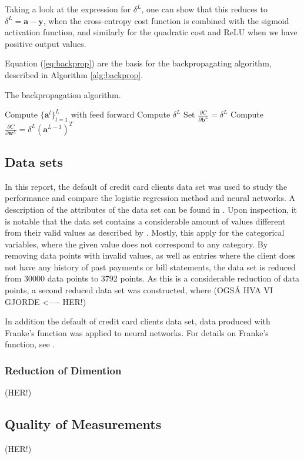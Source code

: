 Taking a look at the expression for $\delta^L$, one can show that this reduces to $\delta^L = \boldsymbol{a}-\boldsymbol{y}$, when the cross-entropy cost function is combined with the sigmoid activation function, and similarly for the quadratic cost and ReLU when we have positive output values.

Equation (\ref{eq:backprop}) are the basis for the backpropagating algorithm, described in Algorithm \ref{alg:backprop}.
\begin{algorithm}[htbp]\caption{The backpropagation algorithm.}\label{alg:backprop}
	\SetAlgoLined
	\BlankLine
	\BlankLine
	Compute $\{ \boldsymbol{a}^l\}_{l=1}^L$ with feed forward\;
	Compute $\delta^L$\;
	Set $\frac{\partial C}{\partial \boldsymbol{b}^L} = \delta^L$\;
	Compute $\frac{\partial C}{\partial \boldsymbol{w}^L} = \delta^L(\boldsymbol{a}^{L-1})^T$\;
	\BlankLine
	\BlankLine
	\end{algorithm}


\subsection{Data sets}
In this report, the default of credit card clients data set \citep{yeh2009UCI} was used to study the performance and compare the logistic regression method and neural networks. A description of the attributes of the data set can be found in \cite{yeh2009UCI}. Upon inspection, it is notable that the data set contains a considerable amount of values different from their valid values as described by \citeauthor{yeh2009UCI}. Mostly, this apply for the categorical variables, where the given value does not correspond to any category. By removing data points with invalid values, as well as entries where the client does not have any history of past payments or bill statements, the data set is reduced from 30000 data points to 3792 points. As this is a considerable reduction of data points, a second reduced data set was constructed, where (OGSÅ HVA VI GJORDE <---- HER!)

In addition the default of credit card clients data set, data produced with Franke's function was applied to neural networks. For details on Franke's function, see \cite{prosjekt1}.

\subsubsection*{Reduction of Dimention}
(HER!)

\subsection{Quality of Measurements}
(HER!)
